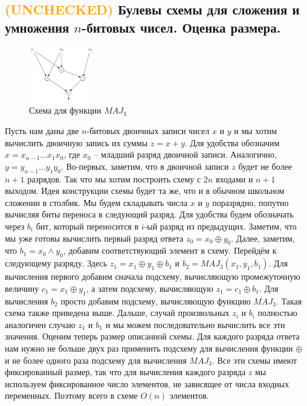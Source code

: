 \documentclass{article}
\begin{document}
\subsection{\textcolor{orange}{(UNCHECKED)} Булевы схемы для сложения и умножения $n$-битовых чисел. Оценка размера.}
\begin{figure}
    \centering
    \includegraphics[width=0.25\textwidth]{maj}
    \caption{Схема для функции $MAJ_3$}
\end{figure}
Пусть нам даны две $n$-битовых двоичных записи чисел $x$ и $y$ и мы хотим вычислить двоичную запись их суммы $z = x + y$. Для удобства обозначим $x = x_{n-1} ... x_1x_0$, где $x_0$ -- младший разряд двоичной записи. Аналогично, $y = y_{n-1} ... y_1y_0$. Во-первых, заметим, что в двоичной записи $z$ будет не более $n + 1$ разрядов. Так что мы хотим построить схему с $2n$ входами и $n + 1$ выходом.
\newline
Идея конструкции схемы будет та же, что и в обычном школьном сложении в столбик. Мы будем складывать числа $x$ и $y$ поразрядно, попутно вычисляя биты переноса в следующий разряд.
\newline
Для удобства будем обозначать через $b_i$ бит, который переносится в $i$-ый разряд из предыдущих.
\newline
Заметим, что мы уже готовы вычислить первый разряд ответа $z_0 = x_0 \oplus y_0$. Далее, заметим, что $b_1 = x_0 \wedge y_0$, добавим соответствующий элемент в схему. Перейдём к следующему разряду. Здесь $z_1 = x_1 \oplus y_1 \oplus b_1$ и $b_2 = MAJ_3(x_1,y_1,b_1)$. Для вычисления первого добавим сначала подсхему, вычисляющую промежуточную величину $c_1 = x_1 \oplus y_1$, а затем подсхему, вычисляющую $z_1 = c_1 \oplus b_1$. Для вычисления $b_2$ просто добавим подсхему, вычисляющую функцию $MAJ_3$. Такая схема также приведена выше. Дальше, случай произвольных $z_i$ и $b_i$ полностью аналогичен случаю $z_1$ и $b_1$ и мы можем последовательно вычислить все эти значения.
\newline
Оценим теперь размер описанной схемы. Для каждого разряда ответа нам нужно не больше двух раз применить подсхему для вычисления функции $\oplus$ и не более одного раза подсхему для вычисления $MAJ_3$. Все эти схемы имеют фиксированный размер, так что для вычисления каждого разряда $z$ мы используем фиксированное число элементов, не зависящее от числа входных переменных. Поэтому всего в схеме $O(n)$ элементов.
\end{document}
